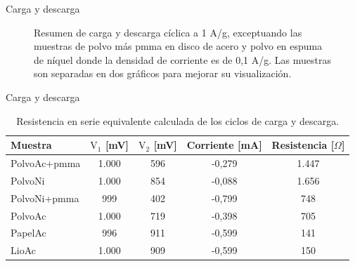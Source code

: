 \documentclass[aspectratio=169]{beamer}
\newcommand{\plotscale}{0.8}
\newcommand{\mPolvoAcero}{PolvoAc }
\newcommand{\mPolvoAceroPMMA}{PolvoAc+pmma }
\newcommand{\mPapelAcero}{PapelAc }
\newcommand{\mLiofilizadoAcero}{LioAc }
\newcommand{\mPolvoNiquel}{PolvoNi }
\newcommand{\mPolvoNiquelPMMA}{PolvoNi+pmma }
\begin{document}
\begin{frame}{Carga y descarga}
\begin{figure}[h!]
\begin{subfigure}[b]{0.4\textwidth}
			\end{subfigure}
			\caption[Resumen de carga y descarga cíclica]{Resumen de carga y descarga cíclica a 1 A/g, exceptuando las muestras de polvo más pmma en disco de acero y polvo en espuma de níquel donde la densidad de corriente es de 0,1 A/g. Las muestras son separadas en dos gráficos para mejorar su visualización.}
			\label{fig:resumen_ccd}
		\end{figure}
	\end{frame}

	\begin{frame}{Carga y descarga}
		\begin{table}[h!]
			\centering
			\caption{Resistencia en serie equivalente calculada de los ciclos de carga y descarga.}
			\begin{tabular}{l c c c c}
				Muestra	&	$\mathrm{V_1}$ [mV]	&	$\mathrm{V_2}$ [mV]	&	Corriente [mA]	&	Resistencia [$\Omega$]	\\
				\hline
				\mPolvoAceroPMMA		&	1.000	&	596	&	-0,279	&	1.447	\\
				\mPolvoNiquel			&	1.000	&	854	&	-0,088	&	1.656	\\
				\mPolvoNiquelPMMA		&	999		&	402	&	-0,799	&	748		\\
				\mPolvoAcero			&	1.000	&	719	&	-0,398	&	705		\\
				\mPapelAcero			&	996		&	911	&	-0,599	&	141		\\
				\mLiofilizadoAcero		&	1.000	&	909	&	-0,599	&	150		\\
			\end{tabular}
			\label{tab:esr}
		\end{table}
	\end{frame}
\end{document}
